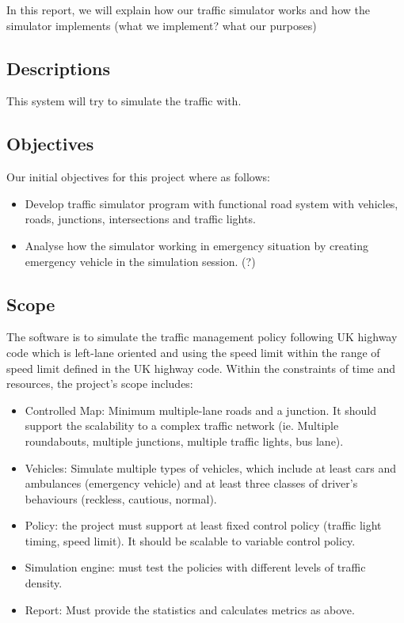 \documentclass[11pt]{article}
\begin{document}
In this report, we will explain how our traffic simulator works and how the simulator implements (what we implement? what our purposes)
	
\subsection{Descriptions}
This system will try to simulate the traffic with.

\subsection{Objectives}
Our initial objectives for this project where as follows:
\begin{itemize}[noitemsep]
\item Develop traffic simulator program with functional road system with vehicles, roads, junctions, intersections and traffic lights.
\item Analyse how the simulator working in emergency situation by creating emergency vehicle in the simulation session. (?)
\end{itemize}

\subsection{Scope}
The software is to simulate the traffic management policy following UK highway code which is left-lane oriented and using the speed limit within the range of speed limit defined in the UK highway code.
Within the constraints of time and resources, the project's scope includes:
\begin{itemize}[noitemsep]
\item Controlled Map: Minimum multiple-lane roads and a junction. It should support the scalability to a complex traffic network (ie. Multiple roundabouts, multiple junctions, multiple traffic lights, bus lane).
\item Vehicles: Simulate multiple types of vehicles, which include at least cars and ambulances (emergency vehicle) and at least three classes of driver’s behaviours (reckless, cautious, normal).
\item Policy: the project must support at least fixed control policy (traffic light timing, speed limit). It should be scalable to variable control policy.
\item Simulation engine: must test the policies with different levels of traffic density.
\item Report: Must provide the statistics and calculates metrics as above.
\end{itemize}
\end{document}
